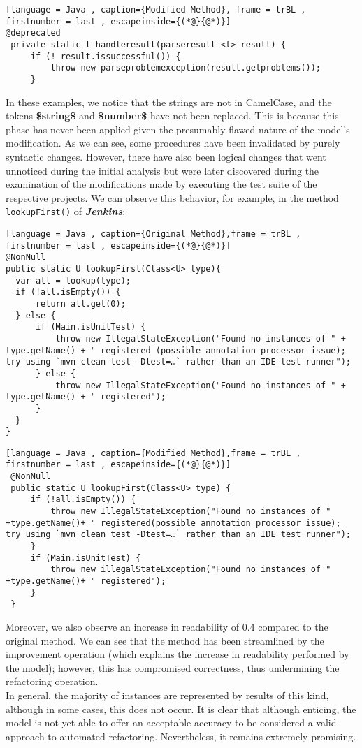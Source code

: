 \newpage
\begin{lstlisting}[language = Java , caption={Modified Method}, frame = trBL , firstnumber = last , escapeinside={(*@}{@*)}]
@deprecated 
 private static t handleresult(parseresult <t> result) { 
     if (! result.issuccessful()) { 
         throw new parseproblemexception(result.getproblems()); 
     }
\end{lstlisting}
In these examples, we notice that the strings are not in CamelCase, and the tokens \textbf{\$string\$} and \textbf{\$number\$} have not been replaced. This is because this phase has never been applied given the presumably flawed nature of the model's modification. As we can see, some procedures have been invalidated by purely syntactic changes. However, there have also been logical changes that went unnoticed during the initial analysis but were later discovered during the examination of the modifications made by executing the test suite of the respective projects. We can observe this behavior, for example, in the method \texttt{lookupFirst()} of \textbf{\textit{Jenkins}}:
\begin{lstlisting}[language = Java , caption={Original Method},frame = trBL , firstnumber = last , escapeinside={(*@}{@*)}]
@NonNull
public static U lookupFirst(Class<U> type){
  var all = lookup(type);
  if (!all.isEmpty()) {
      return all.get(0);
  } else {
      if (Main.isUnitTest) {
          throw new IllegalStateException("Found no instances of " + type.getName() + " registered (possible annotation processor issue); try using `mvn clean test -Dtest=…` rather than an IDE test runner");
      } else {
          throw new IllegalStateException("Found no instances of " + type.getName() + " registered");
      }
  }
}
\end{lstlisting}
\begin{lstlisting}[language = Java , caption={Modified Method},frame = trBL , firstnumber = last , escapeinside={(*@}{@*)}]
 @NonNull 
 public static U lookupFirst(Class<U> type) { 
     if (!all.isEmpty()) { 
         throw new IllegalStateException("Found no instances of " +type.getName()+ " registered(possible annotation processor issue); try using `mvn clean test -Dtest=…` rather than an IDE test runner"); 
     } 
     if (Main.isUnitTest) { 
         throw new illegalStateException("Found no instances of " +type.getName()+ " registered"); 
     } 
 }
\end{lstlisting}
Moreover, we also observe an increase in readability of 0.4 compared to the original method. We can see that the method has been streamlined by the improvement operation (which explains the increase in readability performed by the model); however, this has compromised correctness, thus undermining the refactoring operation. \\ In general, the majority of instances are represented by results of this kind, although in some cases, this does not occur. It is clear that although enticing, the model is not yet able to offer an acceptable accuracy to be considered a valid approach to automated refactoring. Nevertheless, it remains extremely promising.











